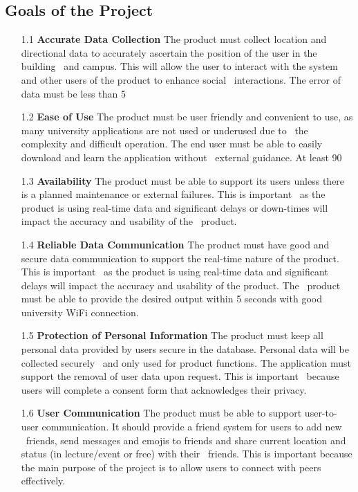 \documentclass[12pt]{article}
\begin{document}
\subsection{Goals of the Project}
\begin{itemize}
  \item[1.1] \textbf{Accurate Data Collection}
  The product must collect location and directional data to accurately ascertain the position of the user in the building \
  and campus. This will allow the user to interact with the system and other users of the product to enhance social \
  interactions. The error of data must be less than 5%

  \item[1.2] \textbf{Ease of Use}
  The product must be user friendly and convenient to use, as many university applications are not used or underused due to \
  the complexity and difficult operation. The end user must be able to easily download and learn the application without \
  external guidance. At least 90%

  \item[1.3] \textbf{Availability}
  The product must be able to support its users unless there is a planned maintenance or external failures. This is important \
  as the product is using real-time data and significant delays or down-times will impact the accuracy and usability of the \
  product.

  \item[1.4] \textbf{Reliable Data Communication}
  The product must have good and secure data communication to support the real-time nature of the product. This is important \
  as the product is using real-time data and significant delays will impact the accuracy and usability of the product. The \
  product must be able to provide the desired output within 5 seconds with good university WiFi connection.

  \item[1.5] \textbf{Protection of Personal Information}
  The product must keep all personal data provided by users secure in the database. Personal data will be collected securely \
  and only used for product functions. The application must support the removal of user data upon request. This is important \
  because users will complete a consent form that acknowledges their privacy.

  \item[1.6] \textbf{User Communication}
  The product must be able to support user-to-user communication. It should provide a friend system for users to add new \
  friends, send messages and emojis to friends and share current location and status (in lecture/event or free) with their \
  friends. This is important because the main purpose of the project is to allow users to connect with peers effectively.


\end{itemize}
\end{document}
